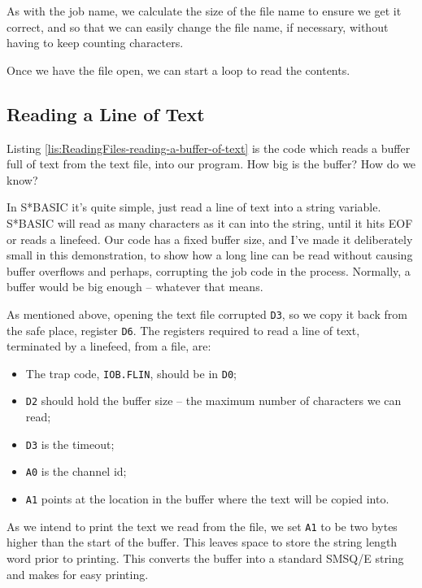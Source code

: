 

As with the job name, we calculate the size of the file name to ensure
we get it correct, and so that we can easily change the file name,
if necessary, without having to keep counting characters.

Once we have the file open, we can start a loop to read the contents.

\subsection{Reading a Line of Text}

Listing \ref{lis:ReadingFiles-reading-a-buffer-of-text} is the code
which reads a buffer full of text from the text file, into our program.
How big is the buffer? How do we know?

In S{*}BASIC it's quite simple, just read a line of text into a string
variable. S{*}BASIC will read as many characters as it can into the
string, until it hits EOF or reads a linefeed. Our code has a fixed
buffer size, and I've made it deliberately small in this demonstration,
to show how a long line can be read without causing buffer overflows
and perhaps, corrupting the job code in the process. Normally, a buffer
would be big enough -- whatever that means.



As mentioned above, opening the text file corrupted \texttt{D3}, so
we copy it back from the safe place, register \texttt{D6}. The registers
required to read a line of text, terminated by a linefeed, from a
file, are:
\begin{itemize}
\item The trap code, \texttt{IOB.FLIN}, should be in \texttt{D0};
\item \texttt{D2} should hold the buffer size -- the maximum number of
characters we can read;
\item \texttt{D3} is the timeout;
\item \texttt{A0} is the channel id;
\item \texttt{A1} points at the location in the buffer where the text will
be copied into.
\end{itemize}
As we intend to print the text we read from the file, we set \texttt{A1}
to be two bytes higher than the start of the buffer. This leaves space
to store the string length word prior to printing. This converts the
buffer into a standard SMSQ/E string and makes for easy printing. 

